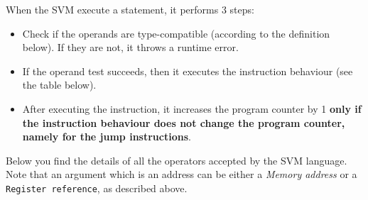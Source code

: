 When the SVM execute a statement, it performs 3 steps:

\begin{itemize}
	\item Check if the operands are type-compatible (according to the definition below). If they are not, it throws a runtime error.
	\item If the operand test succeeds, then it executes the instruction behaviour (see the table below).
	\item After executing the instruction, it increases the program counter by 1 \textbf{only if the instruction behaviour does not change the program counter, namely for the jump instructions}.
\end{itemize}

Below you find the details of all the operators accepted by the SVM language. Note that an argument which is an address can be either a \textit{Memory address} or a \texttt{Register reference}, as described above.

